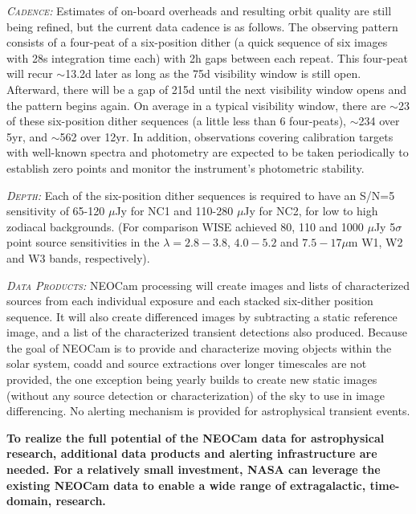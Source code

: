 \documentclass[12pt]{article}
\begin{document}
\smallskip
\smallskip
\noindent
\textsl{\textsc{Cadence:}} Estimates of on-board overheads and resulting orbit quality are still being refined, but the current data cadence is as follows. The observing pattern consists of a four-peat of a six-position dither (a quick sequence of six images with 28s integration time each) with 2h gaps between each repeat. This four-peat will recur $\sim$13.2d later as long as the 75d visibility window is still open. Afterward, there will be a gap of 215d until the next visibility window opens and the pattern begins again. On average in a typical visibility window, there are $\sim$23 of these six-position dither sequences (a little less than 6 four-peats), $\sim$234 over 5yr, and $\sim$562 over 12yr.
In addition, observations covering calibration targets with well-known spectra and photometry are expected to be taken periodically to establish zero points and monitor the instrument's photometric stability. %

\smallskip
\smallskip
\noindent
\textsl{\textsc{Depth:}} Each of the six-position dither sequences is required to have an S/N=5 sensitivity of 65-120 $\mu$Jy for NC1 and 110-280 $\mu$Jy for NC2, for low to high zodiacal backgrounds. 
(For comparison WISE achieved 80, 110 and 1000 $\mu$Jy 5$\sigma$ point source sensitivities in the $\lambda=2.8-3.8$, $4.0-5.2$ and $7.5-17\mu$m W1, W2 and W3 bands, respectively).

\smallskip
\smallskip
\noindent
\textsl{\textsc{Data Products:}} NEOCam processing will create images and lists of characterized sources from each individual exposure and each stacked six-dither position sequence. It will also create differenced images by subtracting a static reference image, and a list of the characterized transient detections also produced. Because the goal of NEOCam is to provide and characterize moving objects within the solar system, coadd and source extractions over longer timescales are not provided, the one exception being yearly builds to create new static images (without any source detection or characterization) of the sky to use in image differencing. No alerting mechanism is provided for astrophysical transient events.  

\smallskip
\smallskip
\noindent
{\bf To realize the full potential of the NEOCam data for
astrophysical research, additional data products and alerting
infrastructure are needed. For a relatively small investment, NASA can
leverage the existing NEOCam data to enable a wide range of
extragalactic, time-domain, research.}
\end{document}
